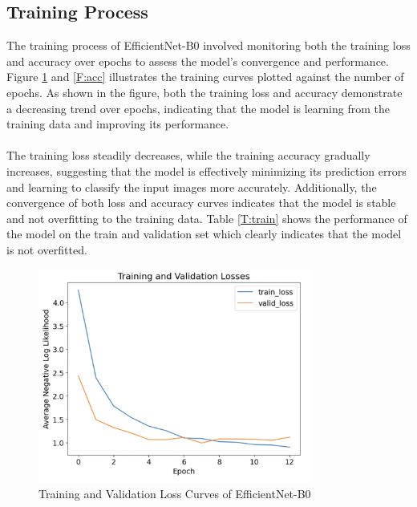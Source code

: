 \documentclass[12pt, a4paper, twoside]{article}
\begin{document}
		\subsection{Training Process}
			The training process of EfficientNet-B0 involved monitoring both the training loss and accuracy over epochs to assess the model's convergence and performance. Figure \ref{F:loss} and \ref{F:acc} illustrates the training curves plotted against the number of epochs. As shown in the figure, both the training loss and accuracy demonstrate a decreasing trend over epochs, indicating that the model is learning from the training data and improving its performance.
			\\
			\\
			The training loss steadily decreases, while the training accuracy gradually increases, suggesting that the model is effectively minimizing its prediction errors and learning to classify the input images more accurately. Additionally, the convergence of both loss and accuracy curves indicates that the model is stable and not overfitting to the training data. Table \ref{T:train} shows the performance of the model on the train and validation set which clearly indicates that the model is not overfitted.
			
			\begin{figure}[p]
				\centering
				\includegraphics[width=0.8\textwidth]{loss.png}
				\caption{Training and Validation Loss  Curves of EfficientNet-B0}
				\label{F:loss}
			\end{figure}
			
\end{document}

